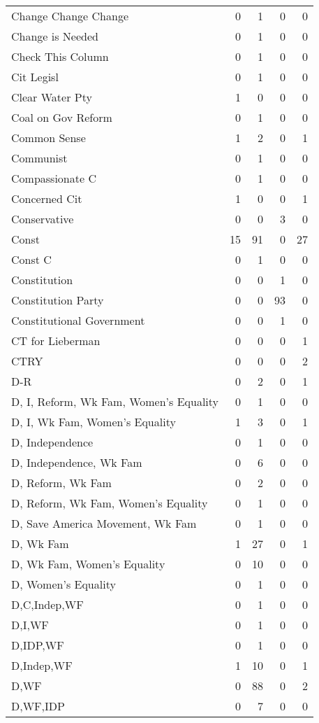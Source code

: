 \begin{supertabular}{lrrrr}
Change Change Change & 0 & 1 & 0 & 0\\
Change is Needed & 0 & 1 & 0 & 0\\
Check This Column & 0 & 1 & 0 & 0\\
Cit Legisl & 0 & 1 & 0 & 0\\
Clear Water Pty & 1 & 0 & 0 & 0\\
Coal on Gov Reform & 0 & 1 & 0 & 0\\
Common Sense & 1 & 2 & 0 & 1\\
Communist & 0 & 1 & 0 & 0\\
Compassionate C & 0 & 1 & 0 & 0\\
Concerned Cit & 1 & 0 & 0 & 1\\
Conservative & 0 & 0 & 3 & 0\\
Const & 15 & 91 & 0 & 27\\
Const C & 0 & 1 & 0 & 0\\
Constitution & 0 & 0 & 1 & 0\\
Constitution Party & 0 & 0 & 93 & 0\\
Constitutional Government & 0 & 0 & 1 & 0\\
CT for Lieberman & 0 & 0 & 0 & 1\\
CTRY & 0 & 0 & 0 & 2\\
D-R & 0 & 2 & 0 & 1\\
D, I, Reform, Wk Fam, Women's Equality & 0 & 1 & 0 & 0\\
D, I, Wk Fam, Women's Equality & 1 & 3 & 0 & 1\\
D, Independence & 0 & 1 & 0 & 0\\
D, Independence, Wk Fam & 0 & 6 & 0 & 0\\
D, Reform, Wk Fam & 0 & 2 & 0 & 0\\
D, Reform, Wk Fam, Women's Equality & 0 & 1 & 0 & 0\\
D, Save America Movement, Wk Fam & 0 & 1 & 0 & 0\\
D, Wk Fam & 1 & 27 & 0 & 1\\
D, Wk Fam, Women's Equality & 0 & 10 & 0 & 0\\
D, Women's Equality & 0 & 1 & 0 & 0\\
D,C,Indep,WF & 0 & 1 & 0 & 0\\
D,I,WF & 0 & 1 & 0 & 0\\
D,IDP,WF & 0 & 1 & 0 & 0\\
D,Indep,WF & 1 & 10 & 0 & 1\\
D,WF & 0 & 88 & 0 & 2\\
D,WF,IDP & 0 & 7 & 0 & 0\\

\end{supertabular}
